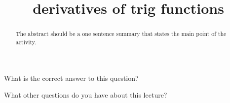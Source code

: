 \documentclass{ximera}
\title{derivatives of trig functions}
\begin{document}
\begin{abstract}
  The abstract should be a one sentence summary that states the main point of the activity.
\end{abstract}

\maketitle

\begin{question}
  What is the correct answer to this question?

  
    \begin{multipleChoice}
    \end{multipleChoice}  
  
\end{question}

What other questions do you have about this lecture?
\begin{question}
  \begin{freeResponse}
  \end{freeRepsonse}
\end{question}
\end{document}
